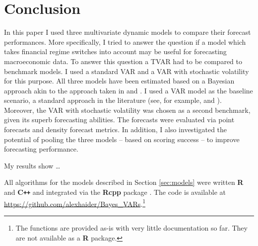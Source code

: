 \documentclass[12pt,letterpaper,fleqn]{article}           %
\begin{document}
\section{Conclusion}
\label{sec:conclusion}

In this paper I used three multivariate dynamic models to compare their forecast performances. More specifically, I tried to answer the question if a model which takes financial regime switches into account may be useful for forecasting macroeconomic data. To answer this question a TVAR had to be compared to benchmark models. I used a standard VAR and a VAR with stochastic volatility for this purpose. All three models have been estimated based on a Bayesian approach akin to the approach taken in \textcite{alessandri17} and \textcite{banbura10}. 
I used a VAR model as the baseline scenario,  a standard approach in the literature (see, for example, \cite{alessandri17} and \cite{clark15}). Moreover, the VAR with stochastic volatility was chosen as a second benchmark, given its superb forecasting abilities. The forecasts were evaluated via point forecasts and density forecast metrics. In addition, I also investigated the potential of pooling the three models -- based on scoring success -- to improve forecasting performance.

My results show \ldots

All algorithms for the models described in Section \ref{sec:models} were written \textbf{\textsf{R}} and \textbf{\textsf{C}\texttt{++}} and integrated via the \textbf{\textsf{Rcpp}} package \parencite{eddel11, eddel17}. %
The code is available at \url{https://github.com/alexhaider/Bayes_VARs}.\footnote{The functions are provided as-is with very little documentation so far. They are not available as a \textbf{\textsf{R}} package.}




\clearpage
\printbibliography





 
\end{document}
